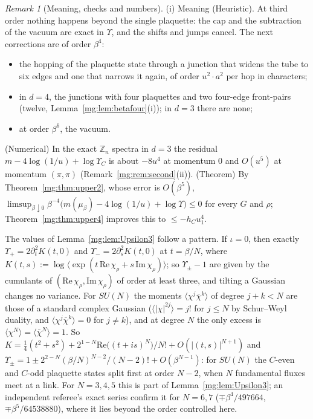 \documentclass[11pt,a4paper]{article}
\theoremstyle{definition}
\theoremstyle{remark}
\newtheorem{remark}[theorem]{Remark}
\begin{document}
\begin{remark}[Meaning, checks and numbers]\label{mg:rem:third}
(i) Meaning (Heuristic). At third order nothing happens beyond the single plaquette: the cap and the subtraction of the vacuum are exact in $\Upsilon$, and the
shifts and jumps cancel. The next corrections are of order $\beta^4$:
\begin{itemize}
\item the hopping of the plaquette state through a junction that widens the tube to six edges and one that narrows it again, of order $u^2\cdot a^2$ per hop
in characters;
\item in $d=4$, the junctions with four plaquettes and two four-edge front-pairs (twelve, Lemma~\ref{mg:lem:betafour}(i)); in $d=3$ there are none;
\item at order $\beta^6$, the vacuum.
\end{itemize}
(Numerical) In the exact $\mathbb Z_n$ spectra in $d=3$ the residual $m-4\log(1/u)+\log\Upsilon_C$ is about $-8u^4$ at momentum $0$ and $O(u^5)$ at momentum
$(\pi,\pi)$ (Remark~\ref{mg:rem:second}(ii)). (Theorem) By Theorem~\ref{mg:thm:upper2}, whose error is $O(\beta^5)$,
$\limsup_{\beta\downarrow0}\beta^{-4}\bigl(m(\mu_\beta)-4\log(1/u)+\log\Upsilon\bigr)\le0$ for every $G$ and $\rho$; Theorem~\ref{mg:thm:upper4} improves
this to $\le-h_Cu_1^4$.

The values of Lemma~\ref{mg:lem:Upsilon3} follow a pattern. If $\iota=0$, then exactly $\Upsilon_+=2\partial_t^2K(t,0)$ and $\Upsilon_-=2\partial_s^2K(t,0)$ at $t=\beta/N$,
where $K(t,s):=\log\langle\exp(t\,\mathrm{Re}\,\chi_\rho+s\,\mathrm{Im}\,\chi_\rho)\rangle$; so $\Upsilon_\pm-1$ are given by the cumulants of
$(\mathrm{Re}\,\chi_\rho,\mathrm{Im}\,\chi_\rho)$ of order at least three, and tilting a Gaussian changes no variance. For $SU(N)$ the moments $\langle\chi^j\bar\chi^k\rangle$
of degree $j+k<N$ are those of a standard complex Gaussian ($\langle|\chi|^{2j}\rangle=j!$ for $j\le N$ by Schur--Weyl duality, and $\langle\chi^j\bar\chi^k\rangle=0$ for
$j\ne k$), and at degree $N$ the only excess is $\langle\chi^N\rangle=\langle\bar\chi^N\rangle=1$. So
$K=\frac14(t^2+s^2)+2^{1-N}\mathrm{Re}\bigl((t+is)^N\bigr)/N!+O(|(t,s)|^{N+1})$ and $\Upsilon_\pm=1\pm2^{2-N}(\beta/N)^{N-2}/(N-2)!+O(\beta^{N-1})$: for $SU(N)$
the $C$-even and $C$-odd plaquette states split first at order $N-2$, when $N$ fundamental fluxes meet at a link. For $N=3,4,5$ this is part of
Lemma~\ref{mg:lem:Upsilon3}; an independent referee's exact series confirm it for $N=6,7$ ($\mp\beta^4/497664$, $\mp\beta^5/64538880$), where it lies beyond the
order controlled here.


\end{remark}
\end{document}
